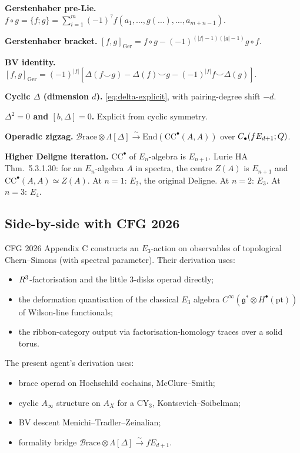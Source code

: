 \documentclass[11pt]{article}
\theoremstyle{definition}
\theoremstyle{remark}
\newcommand{\CC}{\mathrm{CC}}
\newcommand{\Br}{\mathcal{B}\mathrm{race}}
\newcommand{\Ger}{\mathrm{Ger}}
\newcommand{\Ainf}{A_{\infty}}
\begin{document}
\textbf{Gerstenhaber pre-Lie.}
$f \circ g = \{f; g\} = \sum_{i=1}^{m} (-1)^? f(a_1, \ldots, g(\ldots), \ldots, a_{m+n-1})$.

\textbf{Gerstenhaber bracket.}
$[f, g]_\Ger = f \circ g - (-1)^{(|f|-1)(|g|-1)} g \circ f$.

\textbf{BV identity.}
$[f, g]_\Ger = (-1)^{|f|}[\Delta(f \smile g) - \Delta(f) \smile g
 - (-1)^{|f|} f \smile \Delta(g)]$.

\textbf{Cyclic $\Delta$ (dimension $d$).}
\eqref{eq:delta-explicit}, with pairing-degree shift $-d$.

\textbf{$\Delta^2 = 0$ and $[b, \Delta] = 0$.} Explicit from
cyclic symmetry.

\textbf{Operadic zigzag.}
$\Br \otimes \Lambda[\Delta] \xrightarrow{\sim}
\mathrm{End}(\CC^\bullet(A,A))$ over
$C_\bullet(fE_{d+1};Q)$.

\textbf{Higher Deligne iteration.}
$\CC^\bullet$ of $E_n$-algebra is $E_{n+1}$. Lurie HA Thm.~5.3.1.30:
for an $E_n$-algebra $A$ in spectra, the centre $Z(A)$ is $E_{n+1}$
and $\CC^\bullet(A,A) \simeq Z(A)$. At $n = 1$: $E_2$, the original
Deligne. At $n = 2$: $E_3$. At $n = 3$: $E_4$.

\subsection*{Side-by-side with CFG 2026}

CFG 2026 Appendix C constructs an $E_3$-action on observables of
topological Chern--Simons (with spectral parameter). Their derivation
uses:
\begin{itemize}
\item $R^3$-factorisation and the little $3$-disks operad directly;
\item the deformation quantisation of the classical $E_3$ algebra
$C^\infty(\mathfrak{g}^* \otimes H^\bullet(\mathrm{pt}))$ of Wilson-line
functionals;
\item the ribbon-category output via factorisation-homology traces
over a solid torus.
\end{itemize}

The present agent's derivation uses:
\begin{itemize}
\item brace operad on Hochschild cochains, McClure--Smith;
\item cyclic $\Ainf$ structure on $A_X$ for a CY$_3$, Kontsevich--Soibelman;
\item BV descent Menichi--Tradler--Zeinalian;
\item formality bridge $\Br \otimes \Lambda[\Delta] \xrightarrow{\sim} fE_{d+1}$.
\end{itemize}
\end{document}
